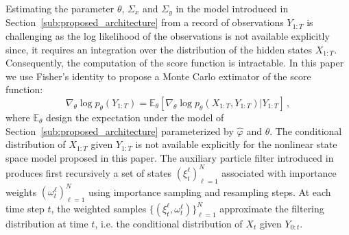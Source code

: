 \documentclass{article}
\begin{document}
Estimating the parameter $\theta$, $\Sigma_x$ and $\Sigma_y$ in the model introduced in Section~\ref{sub:proposed_architecture} from a record of observations $Y_{1:T}$ is challenging as the log likelihood of the observations is not available explicitly since, it requires an integration over the distribution of the hidden states $X_{1:T}$. Consequently, the computation of the score function is intractable.
In this paper we use Fisher's identity to propose a Monte Carlo extimator of the score function:
\begin{equation}
	\nabla_\theta \log p_\theta(Y_{1:T}) = \mathbb{E}_\theta \left[ \nabla_\theta\log p_\theta(X_{1:T}, Y_{1:T}) | Y_{1:T} \right]\,,
	\label{eq:grad_ll}
\end{equation}
where $\mathbb{E}_\theta$ design the expectation under the model of Section~\ref{sub:proposed_architecture} parameterized by $\widehat \varphi$ and $\theta$. The conditional distribution of $X_{1:T}$ given $Y_{1:T}$ is not available explicitly for the nonlinear state space model proposed in this paper. %
The auxiliary particle filter introduced in \cite{Jun1998} produces first recursively a set of states $(\xi^{\ell}_t)_{\ell=1}^N$ associated with importance weights $(\omega^{\ell}_t)_{\ell=1}^N$ using importance sampling and resampling steps.
At each time step $t$, the weighted samples $\{(\xi^{\ell}_t,\omega^{\ell}_t)\}_{\ell=1}^N$ approximate the filtering distribution at time $t$, i.e. the conditional distribution of $X_t$ given $Y_{0:t}$.
\end{document}
